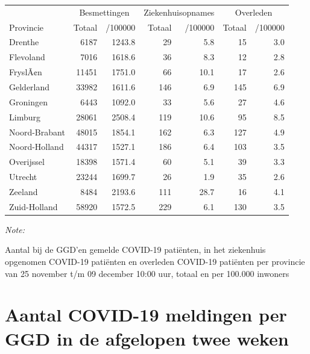 \documentclass[
  english,
  man,floatsintext]{apa6}
\begin{document}
\begin{table}
\centering
\begin{threeparttable}
\begin{tabular}{lrrrrrr}
\toprule
\multicolumn{1}{c}{ } & \multicolumn{2}{c}{Besmettingen} & \multicolumn{2}{c}{Ziekenhuisopnames} & \multicolumn{2}{c}{Overleden} \\
\cmidrule(l{3pt}r{3pt}){2-3} \cmidrule(l{3pt}r{3pt}){4-5} \cmidrule(l{3pt}r{3pt}){6-7}
Provincie & Totaal & /100000 & Totaal & /100000 & Totaal & /100000\\
\midrule
Drenthe & 6187 & 1243.8 & 29 & 5.8 & 15 & 3.0\\
Flevoland & 7016 & 1618.6 & 36 & 8.3 & 12 & 2.8\\
FryslÃ¢n & 11451 & 1751.0 & 66 & 10.1 & 17 & 2.6\\
Gelderland & 33982 & 1611.6 & 146 & 6.9 & 145 & 6.9\\
Groningen & 6443 & 1092.0 & 33 & 5.6 & 27 & 4.6\\
Limburg & 28061 & 2508.4 & 119 & 10.6 & 95 & 8.5\\
Noord-Brabant & 48015 & 1854.1 & 162 & 6.3 & 127 & 4.9\\
Noord-Holland & 44317 & 1527.1 & 186 & 6.4 & 103 & 3.5\\
Overijssel & 18398 & 1571.4 & 60 & 5.1 & 39 & 3.3\\
Utrecht & 23244 & 1699.7 & 26 & 1.9 & 35 & 2.6\\
Zeeland & 8484 & 2193.6 & 111 & 28.7 & 16 & 4.1\\
Zuid-Holland & 58920 & 1572.5 & 229 & 6.1 & 130 & 3.5\\
\bottomrule
\end{tabular}
\begin{tablenotes}
\item \textit{Note: } 
\item Aantal bij de GGD’en gemelde COVID-19 patiënten, in het ziekenhuis opgenomen COVID-19 patiënten en overleden COVID-19 patiënten per provincie van 25 november t/m 09 december 10:00 uur, totaal en per 100.000 inwoners
\end{tablenotes}
\end{threeparttable}
\end{table}

\newpage

\hypertarget{aantal-covid-19-meldingen-per-ggd-in-de-afgelopen-twee-weken}{%
\section{Aantal COVID-19 meldingen per GGD in de afgelopen twee weken}\label{aantal-covid-19-meldingen-per-ggd-in-de-afgelopen-twee-weken}}
\end{document}
